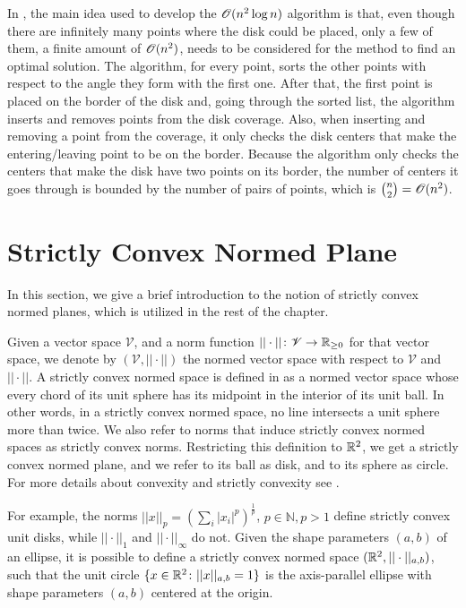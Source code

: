 In , the main idea used to develop the $\mathscr{O}(n^2\log{n})$ algorithm is that, even though there are infinitely many points where the disk could be placed, only a few of them, a finite amount of $\mathscr{O}(n^2)$, needs to be considered for the method to find an optimal solution.
The algorithm, for every point, sorts the other points with respect to the angle they form with the first one. After that, the first point is placed on the border of the disk and, going through the sorted list, the algorithm inserts and removes points from the disk coverage. Also, when inserting and removing a point from the coverage, it only checks the disk centers that make the entering/leaving point to be on the border. Because the algorithm only checks the centers that make the disk have two points on its border, the number of centers it goes through is bounded by the number of pairs of points, which is $\binom{n}{2} = \mathscr{O}(n^2)$.

\section{Strictly Convex Normed Plane}

In this section, we give a brief introduction to the notion of strictly convex normed planes, which is utilized in the rest of the chapter.

Given a vector space $\mathscr{V}$, and a norm function $||\cdot|| \colon \mathscr{V} \to \mathbb{R}_{\ge0}$ for that vector space, we denote by $(\mathscr{V}, ||\cdot||)$ the normed vector space with respect to $\mathscr{V}$ and $||\cdot||$.
A strictly convex normed space is defined in  as a normed vector space whose every chord of its unit sphere has its midpoint in the interior of its unit ball. In other words, in a strictly convex normed space, no line intersects a unit sphere more than twice. 
We also refer to norms that induce strictly convex normed spaces as strictly convex norms.
Restricting this definition to $\mathbb{R}^2$, we get a strictly convex normed plane, and we refer to its ball as disk, and to its sphere as circle.
For more details about convexity and strictly convexity see .

For example, the norms $||x||_p=(\sum_{i} |x_i|^p)^{\frac{1}{p}}$, $p\in \mathbb{N}, p>1$ define strictly convex unit disks, while $||\cdot||_1$ and $||\cdot||_{\infty}$ do not.
Given the shape parameters $(a, b)$ of an ellipse, it is possible to define a strictly convex normed space $(\mathbb{R}^2,||\cdot||_{a,b})$, such that the unit circle $\{x \in \mathbb{R}^2\colon ||x||_{a, b} = 1\}$ is the axis-parallel ellipse with shape parameters $(a, b)$ centered at the origin.

